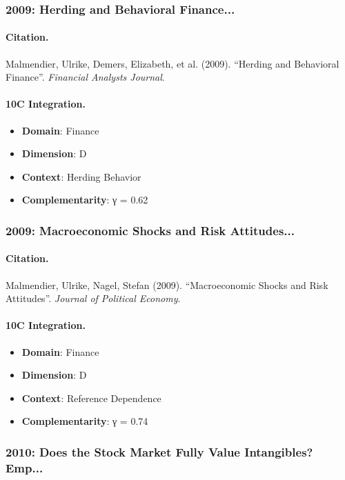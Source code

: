 \subsubsection{2009: Herding and Behavioral Finance...}

\paragraph{Citation.}
Malmendier, Ulrike, Demers, Elizabeth, et al. (2009). ``Herding and Behavioral Finance''. \textit{Financial Analysts Journal}.

\paragraph{10C Integration.}
\begin{itemize}[nosep]
  \item \textbf{Domain}: Finance
  \item \textbf{Dimension}: D
  \item \textbf{Context}: Herding Behavior
  \item \textbf{Complementarity}: γ = 0.62
\end{itemize}


\subsubsection{2009: Macroeconomic Shocks and Risk Attitudes...}

\paragraph{Citation.}
Malmendier, Ulrike, Nagel, Stefan (2009). ``Macroeconomic Shocks and Risk Attitudes''. \textit{Journal of Political Economy}.

\paragraph{10C Integration.}
\begin{itemize}[nosep]
  \item \textbf{Domain}: Finance
  \item \textbf{Dimension}: D
  \item \textbf{Context}: Reference Dependence
  \item \textbf{Complementarity}: γ = 0.74
\end{itemize}


\subsubsection{2010: Does the Stock Market Fully Value Intangibles? Emp...}

